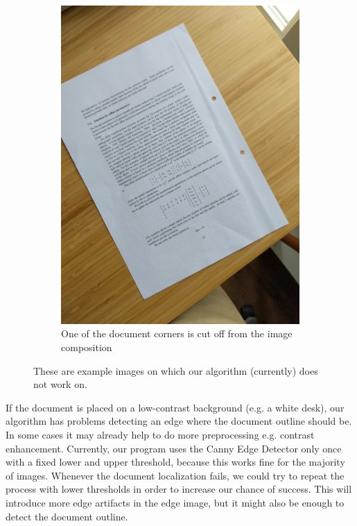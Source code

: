 \documentclass[bibliography=totoc]{scrartcl}
\begin{document}
\begin{figure}[h!]
\begin{subfigure}[b]{0.3\linewidth}
		  \includegraphics[width=\linewidth]{imgs/not_working/missing_corner.jpg}
		  \caption{One of the document corners is cut off from the image composition}
		\end{subfigure}
		\caption{These are example images on which our algorithm (currently) does not work on.}
		\label{fig:known_problems}
	  \end{figure}
	
	If the document is placed on a low-contrast background (e.g. a white desk), our algorithm has problems detecting an edge where the document outline should be.
	In some cases it may already help to do more preprocessing e.g. contrast enhancement.
	Currently, our program uses the Canny Edge Detector only once with a fixed lower and upper threshold, because this works fine for the majority of images.
	Whenever the document localization fails, we could try to repeat the process with lower thresholds in order to increase our chance of success. 
	This will introduce more edge artifacts in the edge image, but it might also be enough to detect the document outline.
\end{document}
